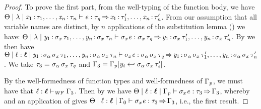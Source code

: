 \begin{proof}
  To prove the first part, from the well-typing of the function body, we have
  $ \Theta   \mid   \lambda   \mid    \mathit{x_{{\mathrm{1}}}} \operatorname{:} \tau_{{\mathrm{1}}} ,\ldots, \mathit{x_{\mathit{n}}} \operatorname{:} \tau_{\mathit{n}}    \vdash   \mathit{e}  :  \tau_{\mathit{q}}   \operatorname{\Rightarrow}    \mathit{x_{{\mathrm{1}}}} \operatorname{:} \tau'_{{\mathrm{1}}} ,\ldots, \mathit{x_{\mathit{n}}} \operatorname{:} \tau'_{\mathit{n}}  $.
  From our assumption that all variable names are distinct,
  by $n$ applications of the substitution lemma () we have:
  $ \Theta   \mid   \lambda   \mid    \mathit{y_{{\mathrm{1}}}} \operatorname{:} \sigma_{x} \, \tau_{{\mathrm{1}}} ,\ldots, \mathit{y_{\mathit{n}}} \operatorname{:} \sigma_{x} \, \tau_{\mathit{n}}    \vdash    \sigma_{x}   \mathit{e}   :  \sigma_{x} \, \tau_{\mathit{q}}   \operatorname{\Rightarrow}    \mathit{y_{{\mathrm{1}}}} \operatorname{:} \sigma_{x} \, \tau'_{{\mathrm{1}}} ,\ldots, \mathit{y_{\mathit{n}}} \operatorname{:} \sigma_{x} \, \tau'_{\mathit{n}}  $.
  By  we then have
  $ \Theta   \mid   \ell  \ottsym{:}  \oldvec{\ell}   \mid    \mathit{y_{{\mathrm{1}}}} \COL \sigma_{\alpha} \, \sigma_{x} \, \tau_{{\mathrm{1}}} ,\ldots, \mathit{y_{\ottmv{n}}} \COL \sigma_{\alpha} \, \sigma_{x} \, \tau_{\ottmv{n}}    \vdash    \sigma_{x}   \ottnt{e}   :  \sigma_{\alpha} \, \sigma_{x} \, \tau_{\ottmv{q}}   \produces    \mathit{y_{{\mathrm{1}}}} \COL \sigma_{\alpha} \, \sigma_{x} \, \tau'_{{\mathrm{1}}} ,\ldots, \mathit{y_{\ottmv{n}}} \COL \sigma_{\alpha} \, \sigma_{x} \, \tau'_{\ottmv{n}}  $.
  We take $\tau_{{\mathrm{3}}}  =  \sigma_{\alpha} \, \sigma_{x} \, \tau_{\mathit{q}}$ and $\Gamma_{{\mathrm{3}}}  =  \Gamma_{\mathit{p}}  [  \mathit{y_{\mathit{i}}}  \hookleftarrow  \sigma_{\alpha} \, \sigma_{x} \, \tau'_{\mathit{i}}  ]$.
  
  By the well-formedness of function types and well-formedness of $\Gamma_{\mathit{p}}$,
  we must have that $ \ell  \ottsym{:}  \oldvec{\ell}   \vdash _{\wf}  \Gamma_{{\mathrm{3}}} $.
  Then by  we have
  $ \Theta   \mid   \ell  \ottsym{:}  \oldvec{\ell}   \mid   \Gamma_{\ottmv{p}}   \vdash    \sigma_{x}   \ottnt{e}   :  \tau_{{\mathrm{3}}}   \produces   \Gamma_{{\mathrm{3}}} $, whereby 
  and an application of 
  gives $ \Theta   \mid   \ell  \ottsym{:}  \oldvec{\ell}   \mid   \Gamma_{{\mathrm{0}}}   \vdash    \sigma_{x}   \ottnt{e}   :  \tau_{{\mathrm{3}}}   \produces   \Gamma_{{\mathrm{3}}} $, i.e., the first result.


\end{proof}
